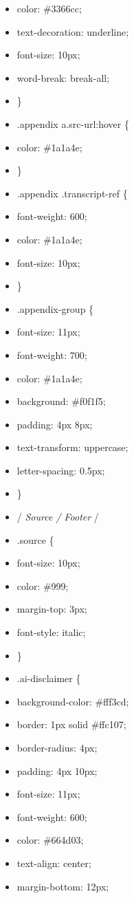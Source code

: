 \documentclass[11pt]{article}
\begin{document}
\begin{itemize}[leftmargin=*,itemsep=2pt,topsep=2pt]
\item {} color: \#3366cc;
\item {} text-decoration: underline;
\item {} font-size: 10px;
\item {} word-break: break-all;
\item {} \}
\item {} .appendix a.src-url:hover \{
\item {} color: \#1a1a4e;
\item {} \}
\item {} .appendix .transcript-ref \{
\item {} font-weight: 600;
\item {} color: \#1a1a4e;
\item {} font-size: 10px;
\item {} \}
\item {} .appendix-group \{
\item {} font-size: 11px;
\item {} font-weight: 700;
\item {} color: \#1a1a4e;
\item {} background: \#f0f1f5;
\item {} padding: 4px 8px;
\item {} text-transform: uppercase;
\item {} letter-spacing: 0.5px;
\item {} \}
\item {} /\emph{ Source / Footer }/
\item {} .source \{
\item {} font-size: 10px;
\item {} color: \#999;
\item {} margin-top: 3px;
\item {} font-style: italic;
\item {} \}
\item {} .ai-disclaimer \{
\item {} background-color: \#fff3cd;
\item {} border: 1px solid \#ffc107;
\item {} border-radius: 4px;
\item {} padding: 4px 10px;
\item {} font-size: 11px;
\item {} font-weight: 600;
\item {} color: \#664d03;
\item {} text-align: center;
\item {} margin-bottom: 12px;

\end{itemize}
\end{document}
